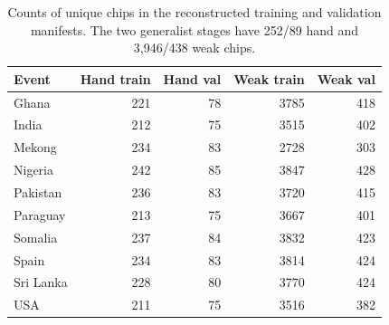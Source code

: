 \begin{table}[htbp]
\centering\small
\caption{Counts of unique chips in the reconstructed training and validation manifests. The two generalist stages have 252/89 hand and 3,946/438 weak chips.}
\label{tab:a1budgets}
\begin{tabular}{@{}lrrrr@{}}
\toprule
Event & Hand train & Hand val & Weak train & Weak val \\
\midrule
Ghana & 221 & 78 & 3785 & 418 \\
India & 212 & 75 & 3515 & 402 \\
Mekong & 234 & 83 & 2728 & 303 \\
Nigeria & 242 & 85 & 3847 & 428 \\
Pakistan & 236 & 83 & 3720 & 415 \\
Paraguay & 213 & 75 & 3667 & 401 \\
Somalia & 237 & 84 & 3832 & 423 \\
Spain & 234 & 83 & 3814 & 424 \\
Sri Lanka & 228 & 80 & 3770 & 424 \\
USA & 211 & 75 & 3516 & 382 \\
\bottomrule
\end{tabular}
\end{table}
